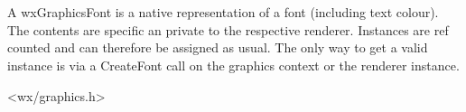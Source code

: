 
\section{}\label{wxgraphicsfont}



A wxGraphicsFont is a native representation of a font (including text colour). The contents are specific an private to the respective renderer. Instances are ref counted 
and can therefore be assigned as usual. The only way to get a valid instance is via a CreateFont call on the graphics context or the renderer instance.


<wx/graphics.h>


